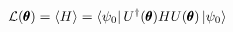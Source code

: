 \documentclass{article}
\begin{document}
\[\mathcal L(\pmb\theta) = \langle H \rangle = \bra{\psi_0}U^{\dagger}(\pmb\theta)HU(\pmb\theta)\ket{\psi_0}
\]
\end{document}
